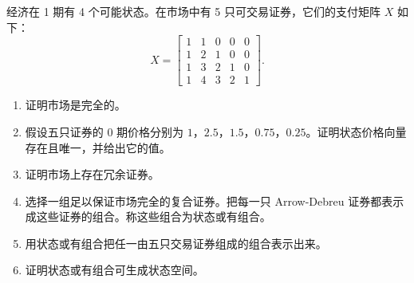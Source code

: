 
\begin{problem}
 经济在 1 期有 4 个可能状态。在市场中有 5 只可交易证券，它们的支付矩阵 $X$ 如下：
\[
    X=\begin{bmatrix}
        1 & 1 & 0 & 0 & 0 \\
        1 & 2 & 1 & 0 & 0 \\
        1 & 3 & 2 & 1 & 0 \\
        1 & 4 & 3 & 2 & 1
    \end{bmatrix}.
\]
\begin{enumerate}[label=(\alph*)]
    \item 证明市场是完全的。
    \item 假设五只证券的 0 期价格分别为 $1$，$2.5$，$1.5$，$0.75$，$0.25$。证明状态价格向量存在且唯一，并给出它的值。
    \item 证明市场上存在冗余证券。
    \item 选择一组足以保证市场完全的复合证券。把每一只 Arrow-Debreu 证券都表示成这些证券的组合。称这些组合为状态或有组合。
    \item 用状态或有组合把任一由五只交易证券组成的组合表示出来。
    \item 证明状态或有组合可生成状态空间。
\end{enumerate}
\end{problem}
